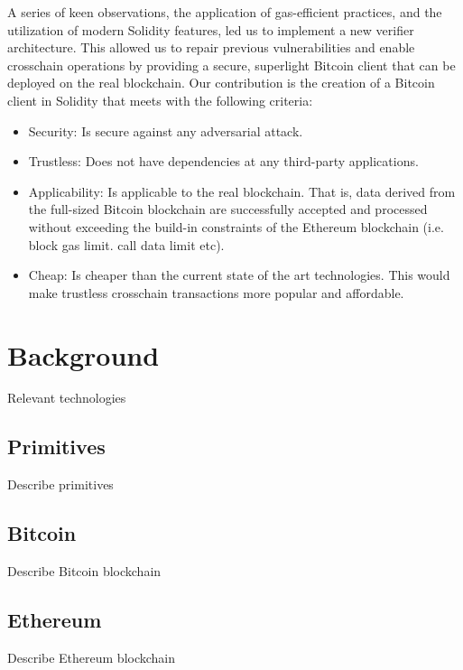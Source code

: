 \documentclass{article}
\begin{document}
  A series of keen observations, the application of gas-efficient
  practices, and the utilization of modern Solidity features, led us to
  implement a new verifier architecture. This allowed us to repair
  previous vulnerabilities and enable crosschain operations by providing
  a secure, superlight Bitcoin client that can be deployed on the real
  blockchain. \bigbreak Our contribution is the creation of a Bitcoin
  client in Solidity that meets with the following criteria:
  \begin{itemize}
  \item
    Security: Is secure against any adversarial attack.
  \item
    Trustless: Does not have dependencies at any third-party
    applications.
  \item
    Applicability: Is applicable to the real blockchain. That is, data
    derived from the full-sized Bitcoin blockchain are successfully
    accepted and processed without exceeding the build-in constraints of
    the Ethereum blockchain (i.e. block gas limit. call data limit etc).
  \item
    Cheap: Is cheaper than the current state of the art technologies.
    This would make trustless crosschain transactions more popular and
    affordable.
  \end{itemize}

  \pagebreak

  \section{Background}

  Relevant technologies

  \subsection{Primitives}

  Describe primitives

  \subsection{Bitcoin}

  Describe Bitcoin blockchain

  \subsection{Ethereum}

  Describe Ethereum blockchain
\end{document}
